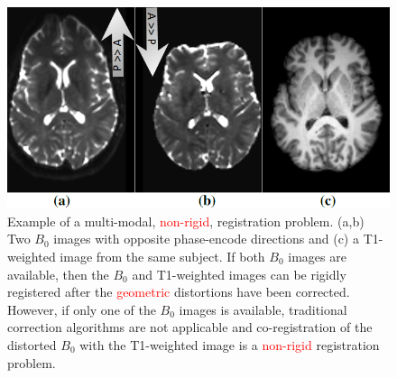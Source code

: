 \begin{figure}[t!]
\centering
    \includegraphics[width=1\linewidth]{images/T1B0Result/figure1.png}
    \closer
    \caption{{\small Example of a multi-modal, \textcolor{red}{non-rigid}, registration problem. (a,b) Two $B_{0}$ images with opposite phase-encode directions and (c) a T1-weighted image from the same subject. If both $B_{0}$ images are available, then the $B_{0}$ and T1-weighted images can be rigidly registered after the \textcolor{red}{geometric} distortions have been corrected. However, if only one of the $B_{0}$ images is available, traditional correction algorithms are not applicable and co-registration of the distorted $B_{0}$ with the T1-weighted image is a \textcolor{red}{non-rigid} registration problem.}}
\label{fig:example_t1b0_problem}\figcloser
\end{figure}
\vspace{-0.4cm}
